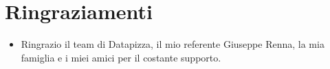 \chapter{Ringraziamenti}
\begin{itemize}
\item Ringrazio il team di Datapizza, il mio referente Giuseppe Renna,
la mia famiglia e i miei amici per il costante supporto.
\end{itemize}